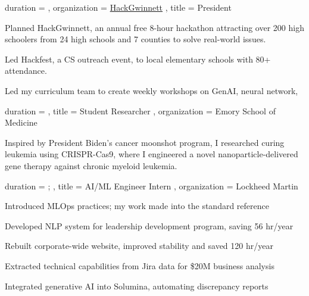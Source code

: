 \documentclass[sidebar-width=2in, primary=slate, linespace=1.2]{clean-resume}
\begin{document}
\begin{main}
\begin{experience}
    \end{experience}

     \begin{experience}
      {
        duration = {  },
        organization = { \href{https://hackgwinnett.github.io/}{HackGwinnett} },
        title = { President }
      }
      \item Planned HackGwinnett, an annual free 8-hour hackathon attracting over 200 high schoolers from 24 high schools and 7 counties to solve real-world issues.
      \item Led Hackfest, a CS outreach event, to local elementary schools with 80+ attendance.
      \item Led my curriculum team to create weekly workshops on GenAI, neural network, \etc
      
    \end{experience}

    \begin{experience}
        {
            duration = {  },
            title = { Student Researcher },
            organization = { Emory School of Medicine }
        }
        \item Inspired by President Biden's cancer moonshot program, I researched curing leukemia using CRISPR-Cas9, where I engineered a novel nanoparticle-delivered gene therapy against chronic myeloid leukemia.
    \end{experience}
    
    \begin{experience}
        {
            duration = { ;  },
            title = { AI/ML Engineer Intern },
            organization = { Lockheed Martin }
        }
        \item Introduced MLOps practices; my work made into the standard reference
        \item Developed NLP system for leadership development program, saving 56 hr/year
        \item Rebuilt corporate-wide website, improved stability and saved 120 hr/year
        \item Extracted technical capabilities from Jira data for \$20M business analysis
        \item Integrated generative AI into Solumina, automating discrepancy reports
    \end{experience}


\end{main}
\end{document}
